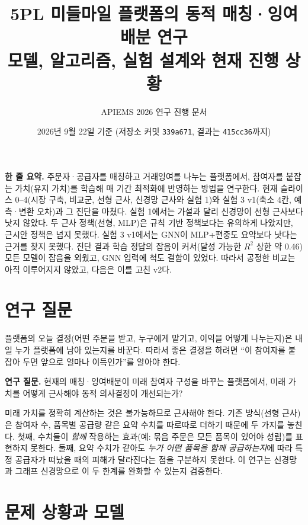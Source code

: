 \documentclass[11pt,a4paper]{article}
\title{5PL 미들마일 플랫폼의 동적 매칭·잉여배분 연구\\[4pt]
\large 모델, 알고리즘, 실험 설계와 현재 진행 상황}
\author{APIEMS 2026 연구 진행 문서}
\date{2026년 9월 22일 기준 (저장소 커밋 \texttt{339a671}, 결과는 \texttt{415cc36}까지)}
\newcommand{\keypoint}[1]{%
  \par\smallskip\noindent\colorbox{boxbg}{\parbox{\dimexpr\linewidth-2\fboxsep}{#1}}\par\smallskip}
\begin{document}
\maketitle

\keypoint{\textbf{한 줄 요약.}
주문자·공급자를 매칭하고 거래잉여를 나누는 플랫폼에서, 참여자를 붙잡는 가치(유지 가치)를
학습해 매 기간 최적화에 반영하는 방법을 연구한다.
현재 슬라이스 0--4(시장 구축, 비교군, 선형 근사, 신경망 근사와 실험 1)와 실험 3 v1(축소 4칸, 예측·변환 오차)과 그 진단을 마쳤다.
실험 1에서는 가설과 달리 신경망이 선형 근사보다 낫지 않았다. 두 근사 정책(선형, MLP)은 규칙 기반 정책보다는
유의하게 나았지만, 근시안 정책은 넘지 못했다.
실험 3 v1에서는 GNN이 MLP+편중도 요약보다 낫다는 근거를 찾지 못했다. 진단 결과 학습 정답의 잡음이 커서(달성 가능한 $R^2$ 상한 약 0.46)
모든 모델이 잡음을 외웠고, GNN 입력에 척도 결함이 있었다. 따라서 공정한 비교는 아직 이루어지지 않았고, 다음은 이를 고친 v2다.}

\tableofcontents
\newpage

\section{연구 질문}

플랫폼의 오늘 결정(어떤 주문을 받고, 누구에게 맡기고, 이익을 어떻게 나누는지)은
내일 누가 플랫폼에 남아 있는지를 바꾼다. 따라서 좋은 결정을 하려면
``이 참여자를 붙잡아 두면 앞으로 얼마나 이득인가''를 알아야 한다.

\keypoint{\textbf{연구 질문.} 현재의 매칭·잉여배분이 미래 참여자 구성을 바꾸는 플랫폼에서,
미래 가치를 어떻게 근사해야 동적 의사결정이 개선되는가?}

미래 가치를 정확히 계산하는 것은 불가능하므로 근사해야 한다. 기존 방식(선형 근사)은
참여자 수, 품목별 공급량 같은 요약 수치를 따로따로 더하기 때문에 두 가지를 놓친다.
첫째, 수치들이 \emph{함께} 작용하는 효과(예: 묶음 주문은 모든 품목이 있어야 성립)를 표현하지 못한다.
둘째, 요약 수치가 같아도 \emph{누가 어떤 품목을 함께 공급하는지}에 따라
특정 공급자가 떠났을 때의 피해가 달라진다는 점을 구분하지 못한다.
이 연구는 신경망과 그래프 신경망으로 이 두 한계를 완화할 수 있는지 검증한다.

\section{문제 상황과 모델}
\end{document}
